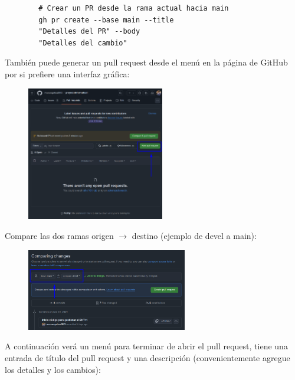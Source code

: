 \documentclass[a4paper]{article}
\begin{document}
    \begin{lstlisting}
        # Crear un PR desde la rama actual hacia main
        gh pr create --base main --title
        "Detalles del PR" --body
        "Detalles del cambio"
    \end{lstlisting}

\indent También puede generar un pull request desde el menú en la página de GitHub por si prefiere una interfaz gráfica: \\

\begin{figure}[h!]
    \centering
    \includegraphics[width=6cm]{../imagenesParaInformes/pullRequestMenu.png}
\end{figure}

\indent Compare las dos ramas origen $\rightarrow$ destino (ejemplo de devel a main): \\

\begin{figure}[h!]
    \centering
    \includegraphics[width=7cm]{../imagenesParaInformes/comparingChanges.png}
\end{figure}

\indent A continuación verá un menú para terminar de abrir el pull request, tiene una entrada de título del pull request y una descripción (convenientemente agregue los detalles y los cambios): \\

\newpage
\noindent
\thispagestyle{fancy}
\end{document}
